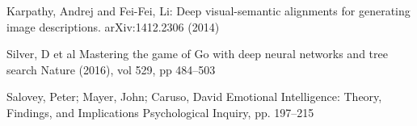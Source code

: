 \documentclass[citeauthoryear]{llncs}
\begin{document}
\begin{thebibliography}{}
Karpathy, Andrej and Fei-Fei, Li:
Deep visual-semantic alignments for generating image descriptions.
arXiv:1412.2306 (2014)



Silver, D et al
Mastering the game of Go with deep neural networks and tree search
Nature (2016), vol 529, pp 484--503


Salovey, Peter; Mayer, John; Caruso, David 
Emotional Intelligence: Theory, Findings, and Implications
Psychological Inquiry, pp. 197–215


\end{thebibliography}
\end{document}
